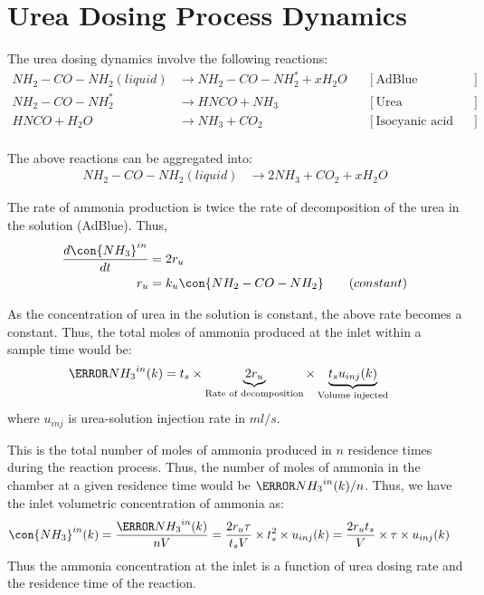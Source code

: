 \section{Urea Dosing Process Dynamics}
The urea dosing dynamics involve the following reactions:
\begin{align*}
    NH_2 - CO - NH_2 (liquid) &\longrightarrow NH_2 - CO - NH_2^* + x H_2 O
                & &[\text{AdBlue evaporation}] \\
    NH_2 - CO - NH_2^*  &\longrightarrow  HNCO + NH_3
                & &[\text{Urea decomposition}] \\
    HNCO + H_2O &\longrightarrow NH_3 + CO_2
                & &[\text{Isocyanic acid hydrolysis}] \\
\end{align*}

The above reactions can be aggregated into:
\begin{align*}
    NH_2 - CO - NH_2 (liquid) &\longrightarrow 2 NH_3 + CO_2 + x H_2 O
\end{align*}

The rate of ammonia production is twice the rate of decomposition of the urea in the solution (AdBlue). Thus,
\begin{align*}
    \frac{d \con{NH_3}^{in}}{dt} &= 2 r_{u}\\
    r_{u} &= k_{u} \con{NH_2 - CO - NH_2} \qquad (constant)
\end{align*}

As the concentration of urea in the solution is constant, the above rate becomes a constant. Thus, the total moles of
ammonia produced at the inlet within a sample time would be:
\begin{align*}
    \mol{NH_3}^{in} (k) &= t_s \times \underbrace{2 r_{u}}_{\text{Rate of decomposition}} \times \underbrace{t_s u_{inj} (k)}_{\text{Volume injected}}
\end{align*}
where $u_{inj}$ is urea-solution injection rate in $ml/s$.

This is the total number of moles of ammonia produced in $n$ residence times during the reaction process. Thus, the number of moles of ammonia in the chamber at a given residence time would be $\mol{NH_3}^{in}(k)/n$.
Thus, we have the inlet volumetric concentration of ammonia as:
\begin{align*}
    \con{NH_3}^{in} (k) &= \frac{\mol{NH_3}^{in} (k)}{nV}
                          = \frac{2 r_u \tau}{t_s V} \times t_s^2 \times u_{inj} (k)
                          = \frac{2 r_u t_s}{V} \times \tau \times u_{inj} (k)
\end{align*}
Thus the ammonia concentration at the inlet is a function of urea dosing rate and the residence time of the reaction.


